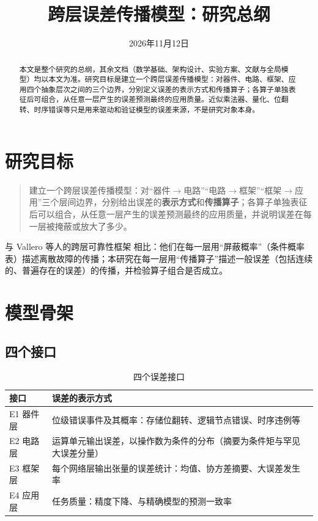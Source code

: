 \documentclass[11pt,a4paper]{ctexart}
\title{跨层误差传播模型：研究总纲}
\date{2026年11月12日}
\begin{document}
\maketitle

\begin{abstract}
本文是整个研究的总纲，其余文档（数学基础、架构设计、实验方案、文献与全局模型）均以本文为准。研究目标是建立一个跨层误差传播模型：对器件、电路、框架、应用四个抽象层次之间的三个边界，分别定义误差的表示方式和传播算子；各算子单独表征后可组合，从任意一层产生的误差预测最终的应用质量。近似乘法器、量化、位翻转、时序错误等只是用来驱动和验证模型的误差来源，不是研究对象本身。
\end{abstract}

\section{研究目标}

\begin{quote}
建立一个跨层误差传播模型：对“器件$\to$电路”“电路$\to$框架”“框架$\to$应用”三个层间边界，分别给出误差的\textbf{表示方式}和\textbf{传播算子}；各算子单独表征后可以组合，从任意一层产生的误差预测最终的应用质量，并说明误差在每一层被掩蔽或放大了多少。
\end{quote}

与 Vallero 等人的跨层可靠性框架 \cite{vallero2016} 相比：他们在每一层用“屏蔽概率”（条件概率表）描述离散故障的传播；本研究在每一层用“传播算子”描述一般误差（包括连续的、普遍存在的误差）的传播，并检验算子组合是否成立。

\section{模型骨架}

\subsection{四个接口}
\begin{table}[h]
\centering
\small
\begin{tabularx}{\textwidth}{@{}lX@{}}
\toprule
接口 & 误差的表示方式 \\
\midrule
E1 器件层 & 位级错误事件及其概率：存储位翻转、逻辑节点错误、时序违例等 \\
E2 电路层 & 运算单元输出误差，以操作数为条件的分布（摘要为条件矩与罕见大误差分量） \\
E3 框架层 & 每个网络层输出张量的误差统计：均值、协方差摘要、大误差发生率 \\
E4 应用层 & 任务质量：精度下降、与精确模型的预测一致率 \\
\bottomrule
\end{tabularx}
\caption{四个误差接口}
\end{table}
\end{document}
